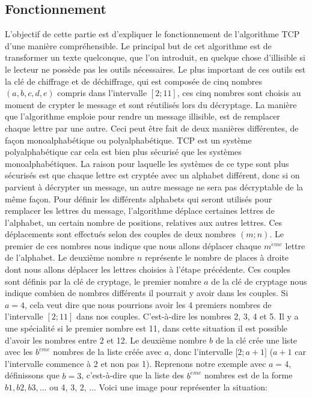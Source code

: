 \documentclass[a4paper,12pt]{report}
\begin{document}
 \subsection{Fonctionnement}
    L'objectif de cette partie est d'expliquer le fonctionnement de l'algorithme TCP d'une manière compréhensible.\newline
     Le principal but de cet algorithme est de transformer un texte quelconque, que l'on introduit, en quelque chose d'illisible si le lecteur ne possède pas les outils nécessaires. Le plus important de ces outils est la clé de chiffrage et de déchiffrage, qui est composée de cinq nombres $(a,b,c,d,e)$ compris dans l'intervalle $[2;11]$, ces cinq nombres sont choisis au moment de crypter le message et sont réutilisés lors du décryptage.
     La manière que l'algorithme emploie pour rendre un message illisible, est de remplacer chaque lettre par une autre. Ceci peut être fait de deux manières différentes, de façon monoalphabétique ou polyalphabétique. TCP est un système polyalphabétique car cela est bien plus sécurisé que les systèmes monoalphabétiques. La raison pour laquelle les systèmes de ce type sont plus sécurisés est que chaque lettre est cryptée avec un alphabet différent, donc si on parvient à décrypter un message, un autre message ne sera pas décryptable de la même façon.\newline
     Pour définir les différents alphabets qui seront utilisés pour remplacer les lettres du message, l'algorithme déplace certaines lettres de l'alphabet, un certain nombre de positions, relatives aux autres lettres. Ces déplacements sont effectués selon des couples de deux nombres $(m;n)$. Le premier de ces nombres nous indique que nous allons déplacer chaque $m^{\grave{e}me}$ lettre de l'alphabet. Le deuxième nombre $n$ représente le nombre de places à droite dont nous allons déplacer les lettres choisies à l'étape précédente.\newline
     Ces couples sont définis par la clé de cryptage, le premier nombre $a$ de la clé de cryptage nous indique combien de nombres différents il pourrait y avoir dans les couples. Si $a = 4$, cela veut dire que nous pourrions avoir les 4 premiers nombres de l'intervalle $[2;11]$ dans nos couples. C'est-à-dire les nombres 2, 3, 4 et 5. Il y a une spécialité si le premier nombre est 11, dans cette situation il est possible d'avoir les nombres entre 2 et 12. \newline 
     Le deuxième nombre $b$ de la clé crée une liste avec les $b^{\grave{e}me}$ nombres de la liste créée avec $a$, donc l'intervalle [$2;a+1]$ ($a+1$ car l'intervalle commence à 2 et non pas 1). Reprenons notre exemple avec $a = 4$, définissons que $b = 3$, c'est-à-dire que la liste des $b^{\grave{e}me}$ nombres est de la forme $b1, b2, b3, ...$ ou  4, 3, 2, ... Voici une image pour représenter la situation:\newline
\end{document}
